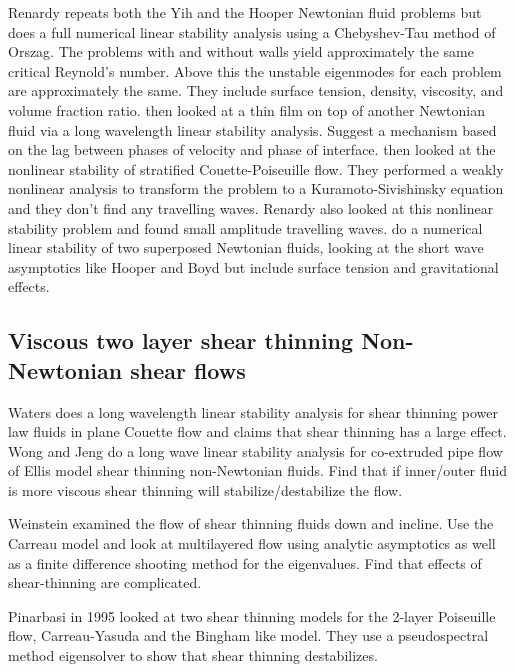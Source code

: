 \documentclass{jfm}
\begin{document}
Renardy \citep{Renardy1985} repeats both the Yih and the Hooper Newtonian fluid
problems but does a full numerical linear stability analysis using a
Chebyshev-Tau method of Orszag. The problems with and without walls yield
approximately the same critical Reynold's number. Above this the unstable
eigenmodes for each problem are approximately the same. They include surface
tension, density, viscosity, and volume fraction ratio.  \citet{Hooper1985}
then looked at a thin film on top of another Newtonian fluid via a long
wavelength linear stability analysis. Suggest a mechanism based on the lag
between phases of velocity and phase of interface.  \citet{Hooper1985} then
looked at the nonlinear stability of stratified Couette-Poiseuille flow. They
performed a weakly nonlinear analysis to transform the problem to a
Kuramoto-Sivishinsky equation and they don't find any travelling waves. Renardy
\citep{Renardy1989} also looked at this nonlinear stability problem and found
small amplitude travelling waves.  \citet{Yiantsios1988} do a numerical linear
stability of two superposed Newtonian fluids, looking at the short wave
asymptotics like Hooper and Boyd but include surface tension and gravitational
effects.

\subsection{Viscous two layer shear thinning Non-Newtonian shear flows}

Waters \citep{Waters1983} does a long wavelength linear stability analysis for
shear thinning power law fluids in plane Couette flow and claims that shear
thinning has a large effect. Wong and Jeng \citep{Wong1987} do a long wave
linear stability analysis for co-extruded pipe flow of Ellis model shear
thinning non-Newtonian fluids. Find that if inner/outer fluid is more viscous
shear thinning will stabilize/destabilize the flow.

Weinstein \citep{Weinstein1990} examined the flow of shear thinning fluids down
and incline. Use the Carreau model and look at multilayered flow using analytic
asymptotics as well as a finite difference shooting method for the eigenvalues.
Find that effects of shear-thinning are complicated.

Pinarbasi \citep{Pinarbasi1995} in 1995 looked at two shear thinning models for
the 2-layer Poiseuille flow, Carreau-Yasuda and the Bingham like model. They
use a pseudospectral method eigensolver to show that shear thinning
destabilizes. 
\end{document}
